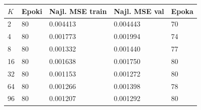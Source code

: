 \begin{tabular}{lllll}
\toprule
$K$ & Epoki & Najl. MSE train & Najl. MSE val & Epoka \\
\midrule
2 & 80 & 0.004413 & 0.004443 & 70 \\
4 & 80 & 0.001773 & 0.001994 & 74 \\
8 & 80 & 0.001332 & 0.001440 & 77 \\
16 & 80 & 0.001638 & 0.001750 & 80 \\
32 & 80 & 0.001153 & 0.001272 & 80 \\
64 & 80 & 0.001266 & 0.001398 & 78 \\
96 & 80 & 0.001207 & 0.001292 & 80 \\
\bottomrule
\end{tabular}
